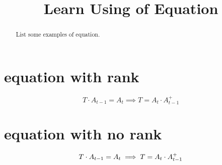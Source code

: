 \documentclass[a4paper]{article}
\begin{document}
    \title{Learn Using of Equation}
    \maketitle
    
    \begin{abstract}
        \vspace{20pt}
        {\large List some examples of equation.}
    \end{abstract}

    \section{equation with rank}
    \begin{equation}
        T \cdot A_{t-1}=A_t \implies T=A_t \cdot A_{t-1}^{+}
        \label{eq_pagerank}
    \end{equation}

    \section{equation with no rank}
    \begin{equation}
        T \cdot A_{t-1}=A_t \implies T=A_t \cdot A_{t-1}^{+}
        \notag%
    \end{equation}
    
        
    
\end{document}
